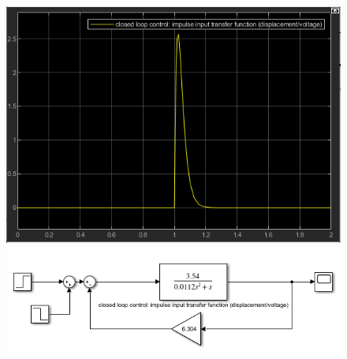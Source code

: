\documentclass[conference]{IEEEtran}
\begin{document}
\begin{figure}[htbp]
    \centering
    \begin{minipage}[b]{0.24\textwidth}
        \includegraphics[width=\textwidth]{./Graph/G7'.png}
        \caption{}
        \label{cltr}
    \end{minipage}
    \hfill
    \begin{minipage}[b]{0.24\textwidth}
        \centering
        \includegraphics[width=\textwidth]{./Graph/G7.png}
        \caption{}
    \end{minipage}
\end{figure}
\end{document}
